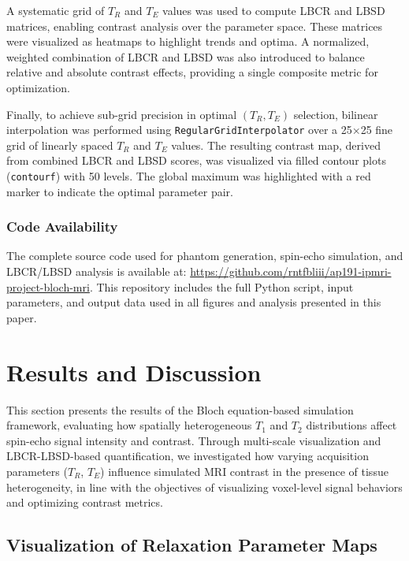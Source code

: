 \documentclass[10pt,a4paper,twoside]{article}
\begin{document}
A systematic grid of \( T_R \) and \( T_E \) values was used to compute LBCR and LBSD matrices, enabling contrast analysis over the parameter space. These matrices were visualized as heatmaps to highlight trends and optima. A normalized, weighted combination of LBCR and LBSD was also introduced to balance relative and absolute contrast effects, providing a single composite metric for optimization.

Finally, to achieve sub-grid precision in optimal  \( (T_R, T_E) \) selection, bilinear interpolation was performed using \texttt{RegularGridInterpolator} over a 25×25 fine grid of linearly spaced $T_R$ and $T_E$ values. The resulting contrast map, derived from combined LBCR and LBSD scores, was visualized via filled contour plots (\texttt{contourf}) with 50 levels. The global maximum was highlighted with a red marker to indicate the optimal parameter pair.

\subsubsection{Code Availability}
The complete source code used for phantom generation, spin-echo simulation, and LBCR/LBSD analysis is available at: \url{https://github.com/rntfbliii/ap191-ipmri-project-bloch-mri}. This repository includes the full Python script, input parameters, and output data used in all figures and analysis presented in this paper.



\section{Results and Discussion}\label{sec:rnd}

This section presents the results of the Bloch equation-based simulation framework, evaluating how spatially heterogeneous $ T_1 $ and $ T_2 $ distributions affect spin-echo signal intensity and contrast. Through multi-scale visualization and LBCR-LBSD-based quantification, we investigated how varying acquisition parameters ($T_R$, $T_E$) influence simulated MRI contrast in the presence of tissue heterogeneity, in line with the objectives of visualizing voxel-level signal behaviors and optimizing contrast metrics.

\subsection{Visualization of Relaxation Parameter Maps}
\end{document}

